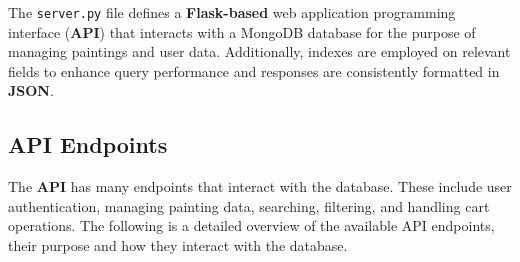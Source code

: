 \documentclass[a4paper,12pt]{article}
\begin{document}
The \texttt{server.py} file defines a \textbf{Flask-based} web application programming interface (\textbf{API}) that interacts with a MongoDB database for the purpose of managing paintings and user data. Additionally, indexes are employed on relevant fields to enhance query performance and responses are consistently formatted in \textbf{JSON}.


\subsection{API Endpoints} \justify The \textbf{API} has many endpoints that interact with the database. These include user authentication, managing painting data, searching, filtering, and handling cart operations. The following is a detailed overview of the available API endpoints, their purpose and how they interact with the database.
\end{document}
